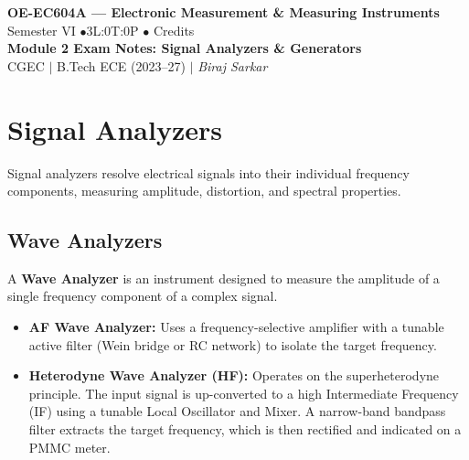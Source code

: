 \documentclass[12pt,a4paper]{article}
\begin{document}

\begin{center}
  {\LARGE\bfseries\color{myred} OE-EC604A --- Electronic Measurement \& Measuring Instruments}\\[5pt]
  {\normalsize\color{mydark} Semester VI \quad$\bullet$\quad 3L:0T:0P \quad$\bullet$ Credits}\\[3pt]
  {\normalsize\color{myteal}\textbf{Module 2 Exam Notes: Signal Analyzers \& Generators}}\\[3pt]
  {\small\color{mydark} CGEC \;$|$\; B.Tech ECE (2023--27) \;$|$\; \textit{Biraj Sarkar}}
\end{center}
\vspace{2pt}
\noindent{\color{myred}\rule{\linewidth}{1.5pt}}
\vspace{2pt}

\hypersetup{linkcolor=mydark}
\tableofcontents
\hypersetup{linkcolor=myteal}
\newpage

\section{Signal Analyzers}

Signal analyzers resolve electrical signals into their individual frequency components, measuring amplitude, distortion, and spectral properties.

\subsection{Wave Analyzers}
A \textbf{Wave Analyzer} is an instrument designed to measure the amplitude of a single frequency component of a complex signal.
\begin{itemize}[leftmargin=*, itemsep=3pt]
  \item \textbf{AF Wave Analyzer:} Uses a frequency-selective amplifier with a tunable active filter (Wein bridge or RC network) to isolate the target frequency.
  \item \textbf{Heterodyne Wave Analyzer (HF):} Operates on the superheterodyne principle. The input signal is up-converted to a high Intermediate Frequency (IF) using a tunable Local Oscillator and Mixer. A narrow-band bandpass filter extracts the target frequency, which is then rectified and indicated on a PMMC meter.
\end{itemize}
\end{document}
